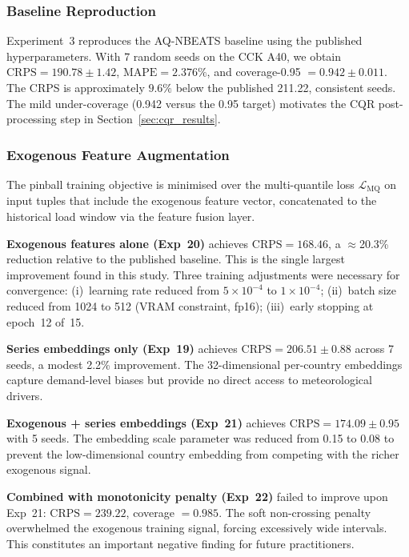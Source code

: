 \subsubsection{Baseline Reproduction}

Experiment~3 reproduces the AQ-NBEATS baseline
\cite{smyl2025anyquantile} using the published hyperparameters.
With 7 random seeds on the CCK A40, we obtain
$\mathrm{CRPS} = 190.78 \pm 1.42$, $\mathrm{MAPE} = 2.376\%$, and
coverage-0.95 $= 0.942 \pm 0.011$.
The CRPS is approximately $9.6\%$ below the published 211.22, consistent
seeds.  The mild under-coverage (0.942 versus the 0.95 target) motivates
the CQR post-processing step in Section~\ref{sec:cqr_results}.

\subsubsection{Exogenous Feature Augmentation}

The pinball training objective is minimised
over the multi-quantile loss $\mathcal{L}_{\mathrm{MQ}}$
on input tuples that include the exogenous feature
vector, concatenated to the historical load
window via the feature fusion layer.

\textbf{Exogenous features alone (Exp~20)} achieves
$\mathrm{CRPS} = \mathbf{168.46}$, a $\approx$20.3\% reduction relative
to the published baseline.  This is the single largest improvement found in
this study.  Three training adjustments were necessary for convergence:
(i)~learning rate reduced from $5 \times 10^{-4}$ to $1 \times 10^{-4}$;
(ii)~batch size reduced from 1024 to 512 (VRAM constraint, fp16);
(iii)~early stopping at epoch~12 of~15.

\textbf{Series embeddings only (Exp~19)} achieves
$\mathrm{CRPS} = 206.51 \pm 0.88$ across 7 seeds, a modest 2.2\%
improvement.  The 32-dimensional per-country embeddings capture
demand-level biases but provide no direct access to meteorological drivers.

\textbf{Exogenous + series embeddings (Exp~21)} achieves
$\mathrm{CRPS} = 174.09 \pm 0.95$ with 5 seeds.  The embedding scale
parameter was reduced from 0.15 to 0.08 to prevent the low-dimensional
country embedding from competing with the richer exogenous signal.

\textbf{Combined with monotonicity penalty (Exp~22)} failed to improve
upon Exp~21: $\mathrm{CRPS} = 239.22$, coverage $= 0.985$.
The soft non-crossing penalty overwhelmed the exogenous training signal,
forcing excessively wide intervals.  This constitutes an important negative
finding for future practitioners.

